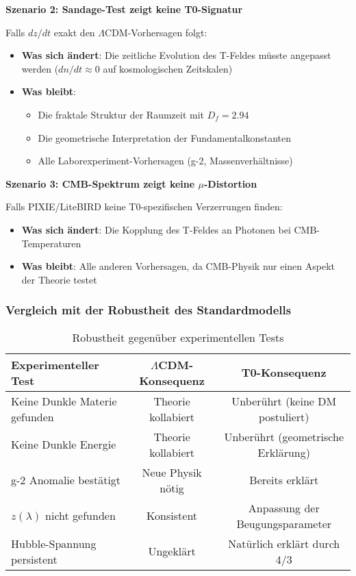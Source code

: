 \documentclass[12pt,a4paper]{article}
\theoremstyle{definition}
\begin{document}
\textbf{Szenario 2: Sandage-Test zeigt keine T0-Signatur}

Falls \(d z/dt\) exakt den \(\Lambda\)CDM-Vorhersagen folgt:
\begin{itemize}
	\item \textbf{Was sich ändert}: Die zeitliche Evolution des T-Feldes müsste angepasst werden (\(dn/dt \approx 0\) auf kosmologischen Zeitskalen)
	\item \textbf{Was bleibt}:
	\begin{itemize}
		\item Die fraktale Struktur der Raumzeit mit \(D_f = 2.94\)
		\item Die geometrische Interpretation der Fundamentalkonstanten
		\item Alle Laborexperiment-Vorhersagen (g-2, Massenverhältnisse)
	\end{itemize}
\end{itemize}

\textbf{Szenario 3: CMB-Spektrum zeigt keine \(\mu\)-Distortion}

Falls PIXIE/LiteBIRD keine T0-spezifischen Verzerrungen finden:
\begin{itemize}
	\item \textbf{Was sich ändert}: Die Kopplung des T-Feldes an Photonen bei CMB-Temperaturen
	\item \textbf{Was bleibt}: Alle anderen Vorhersagen, da CMB-Physik nur einen Aspekt der Theorie testet
\end{itemize}

\subsubsection{Vergleich mit der Robustheit des Standardmodells}

\begin{table}[h]
	\centering
	\caption{Robustheit gegenüber experimentellen Tests}
	\begin{tabular}{lcc}
		\toprule
		\textbf{Experimenteller Test} & \textbf{\(\Lambda\)CDM-Konsequenz} & \textbf{T0-Konsequenz} \\
		\midrule
		Keine Dunkle Materie gefunden & Theorie kollabiert & Unberührt (keine DM postuliert) \\
		Keine Dunkle Energie & Theorie kollabiert & Unberührt (geometrische Erklärung) \\
		g-2 Anomalie bestätigt & Neue Physik nötig & Bereits erklärt \\
		\(z(\lambda)\) nicht gefunden & Konsistent & Anpassung der Beugungsparameter \\
		Hubble-Spannung persistent & Ungeklärt & Natürlich erklärt durch 4/3 \\
		\bottomrule
	\end{tabular}
\end{table}
\end{document}
